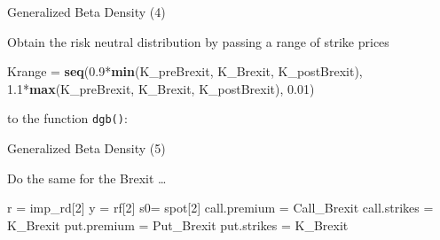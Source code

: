 \documentclass[ignorenonframetext,aspectratio=169]{beamer}
\newenvironment{Shaded}{}{}
\newcommand{\KeywordTok}[1]{\textcolor[rgb]{0.00,0.44,0.13}{\textbf{#1}}}
\newcommand{\DecValTok}[1]{\textcolor[rgb]{0.25,0.63,0.44}{#1}}
\newcommand{\FloatTok}[1]{\textcolor[rgb]{0.25,0.63,0.44}{#1}}
\newcommand{\StringTok}[1]{\textcolor[rgb]{0.25,0.44,0.63}{#1}}
\newcommand{\OperatorTok}[1]{\textcolor[rgb]{0.40,0.40,0.40}{#1}}
\newcommand{\NormalTok}[1]{#1}
\begin{document}
\begin{frame}[fragile]{Generalized Beta Density (4)}

Obtain the risk neutral distribution by passing a range of strike prices

\begin{Shaded}
\begin{Highlighting}[]
\NormalTok{Krange =}\StringTok{ }\KeywordTok{seq}\NormalTok{(}\FloatTok{0.9}\OperatorTok{*}\KeywordTok{min}\NormalTok{(K_preBrexit, K_Brexit, K_postBrexit), }
             \FloatTok{1.1}\OperatorTok{*}\KeywordTok{max}\NormalTok{(K_preBrexit, K_Brexit, K_postBrexit), }
             \FloatTok{0.01}\NormalTok{)}
\end{Highlighting}
\end{Shaded}

to the function \texttt{dgb()}:

\begin{Shaded}
\end{Shaded}

\end{frame}

\begin{frame}[fragile]{Generalized Beta Density (5)}

Do the same for the Brexit \ldots{}

\begin{Shaded}
\begin{Highlighting}[]
\NormalTok{r =}\StringTok{ }\NormalTok{imp_rd[}\DecValTok{2}\NormalTok{]}
\NormalTok{y =}\StringTok{ }\NormalTok{rf[}\DecValTok{2}\NormalTok{]}
\NormalTok{s0=}\StringTok{ }\NormalTok{spot[}\DecValTok{2}\NormalTok{]}
\NormalTok{call.premium =}\StringTok{ }\NormalTok{Call_Brexit}
\NormalTok{call.strikes =}\StringTok{ }\NormalTok{K_Brexit}
\NormalTok{put.premium =}\StringTok{ }\NormalTok{Put_Brexit}
\NormalTok{put.strikes =}\StringTok{ }\NormalTok{K_Brexit}
\end{Highlighting}
\end{Shaded}

\end{frame}
\end{document}
